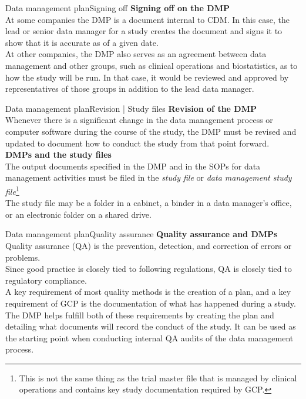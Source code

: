 \documentclass[xcolor=dvipsnames,11pt]{beamer}
\begin{document}
\begin{frame}[fragile]{Data management plan}{Signing off}
	\textbf{Signing off on the DMP}\\
	\bigskip
	At some companies the DMP is a document internal to CDM. In this case, the \textcolor{PineGreen}{lead or senior data manager} for a study creates the document and signs it to show that it is accurate as of a given date.\\
	\bigskip
	At other companies, the DMP also serves as an agreement between data management and other groups, such as clinical operations and biostatistics, as to how the study will be run. In that case, it would be reviewed and approved by \textcolor{PineGreen}{representatives of those groups in addition to the lead data manager}.
\end{frame}

\begin{frame}[fragile]{Data management plan}{Revision | Study files}
	\textbf{Revision of the DMP}\\
	Whenever there is a significant change in the data management process or computer software during the course of the study, the DMP must be revised and updated to document how to conduct the study from that point forward.\\
	\bigskip
	\textbf{DMPs and the study files}\\
	The output documents specified in the DMP and in the SOPs for data management activities must be filed in the \textcolor{PineGreen}{\textit{study file}} or \textcolor{PineGreen}{\textit{data management study file}}\footnote{This is not the same thing as the trial master file that is managed by clinical operations and contains key study documentation required by GCP.}\\
	The study file may be a folder in a cabinet, a binder in a data manager's office, or an electronic folder on a shared drive.
\end{frame}

\begin{frame}[fragile]{Data management plan}{Quality assurance}
	\textbf{Quality assurance and DMPs}\\
	\bigskip
	Quality assurance (QA) is the prevention, detection, and correction of errors or problems.\\
	\bigskip
	 Since good practice is closely tied to following regulations, QA is closely tied to regulatory compliance.\\
	\bigskip
	A key requirement of most quality methods is the creation of a plan, and a key requirement of GCP is the documentation of what has happened during a study.\\
	\bigskip
	The DMP helps fulfill both of these requirements by creating the plan and detailing what documents will record the conduct of the study. It can be used as the starting point when conducting internal QA audits of the data management process.
\end{frame}
\end{document}
